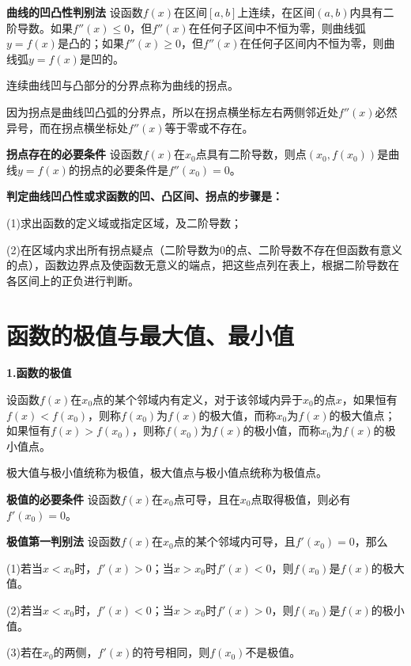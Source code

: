 \textbf{曲线的凹凸性判别法} \quad 设函数$f(x)$在区间$[a,b]$上连续，在区间$(a,b)$内具有二阶导数。如果$f''(x)\leq0$，但$f''(x)$在任何子区间中不恒为零，则曲线弧$y=f(x)$是凸的；如果$f''(x)\geq0$，但$f''(x)$在任何子区间内不恒为零，则曲线弧$y=f(x)$是凹的。

\begin{definition}[拐点的定义] \label{def:inflection_point}
    连续曲线凹与凸部分的分界点称为曲线的拐点。
\end{definition}

因为拐点是曲线凹凸弧的分界点，所以在拐点横坐标左右两侧邻近处$f''(x)$必然异号，而在拐点横坐标处$f''(x)$等于零或不存在。

\textbf{拐点存在的必要条件} \quad 设函数$f(x)$在$x_0$点具有二阶导数，则点$(x_0,f(x_0))$是曲线$y=f(x)$的拐点的必要条件是$f''(x_0)=0$。

\textbf{判定曲线凹凸性或求函数的凹、凸区间、拐点的步骤是：}

(1)求出函数的定义域或指定区域，及二阶导数；

(2)在区域内求出所有拐点疑点（二阶导数为0的点、二阶导数不存在但函数有意义的点），函数边界点及使函数无意义的端点，把这些点列在表上，根据二阶导数在各区间上的正负进行判断。

\section{函数的极值与最大值、最小值}
\textbf{1.函数的极值}
\begin{definition}[极值的定义] \label{def:extremum}
    设函数$f(x)$在$x_0$点的某个邻域内有定义，对于该邻域内异于$x_0$的点$x$，如果恒有$f(x)<f(x_0)$，则称$f(x_0)$为$f(x)$的极大值，而称$x_0$为$f(x)$的极大值点；如果恒有$f(x)>f(x_0)$，则称$f(x_0)$为$f(x)$的极小值，而称$x_0$为$f(x)$的极小值点。

    极大值与极小值统称为极值，极大值点与极小值点统称为极值点。
\end{definition}

\textbf{极值的必要条件} \quad 设函数$f(x)$在$x_0$点可导，且在$x_0$点取得极值，则必有$f'(x_0)=0$。

\textbf{极值第一判别法} \quad 设函数$f(x)$在$x_0$点的某个邻域内可导，且$f'(x_0)=0$，那么

(1)若当$x<x_0$时，$f'(x)>0$；当$x>x_0$时$f'(x)<0$，则$f(x_0)$是$f(x)$的极大值。

(2)若当$x<x_0$时，$f'(x)<0$；当$x>x_0$时$f'(x)>0$，则$f(x_0)$是$f(x)$的极小值。

(3)若在$x_0$的两侧，$f'(x)$的符号相同，则$f(x_0)$不是极值。

